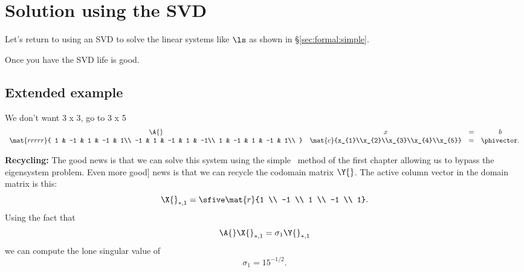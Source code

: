 \section{Solution using the SVD}
Let's return to using an SVD to solve the linear systems like $\ls$ as shown in \S\eqref{sec:formal:simple}.

Once you have the SVD life is good.
 
\subsection{Extended example}
We don't want 3 x 3, go to 3 x 5
\begin{equation}
  \begin{array}{cccc}
    \A{}&x &=& b\\
    \mat{rrrrr}
    {
     1 & -1 &  1 & -1 &  1\\
    -1 &  1 & -1 &  1 & -1\\
     1 & -1 &  1 & -1 &  1\\
    }
    &
    \mat{c}{x_{1}\\x_{2}\\x_{3}\\x_{4}\\x_{5}}
    &=& \phivector.
  \end{array}
\end{equation}

\textbf{Recycling:} The good news is that we can solve this system using the simple \svdl \ method of the first chapter allowing us to bypass the eigensystem problem. Even more good] news is that we can recycle the codomain matrix $\Y{}$. The active column vector in the domain matrix is this:
\begin{equation}
  \X{}_{*,1} = \sfive\mat{r}{1 \\ -1 \\  1 \\ -1 \\  1}.
\end{equation}
Using the fact that
\begin{equation}
  \begin{split}
    \A{}\X{}_{*,1}=\sigma_{1}\Y{}_{*,1}
  \end{split}
\end{equation}
we can compute the lone singular value of
\begin{equation}
  \sigma_{1} = 15^{-1/2}.
\end{equation}

